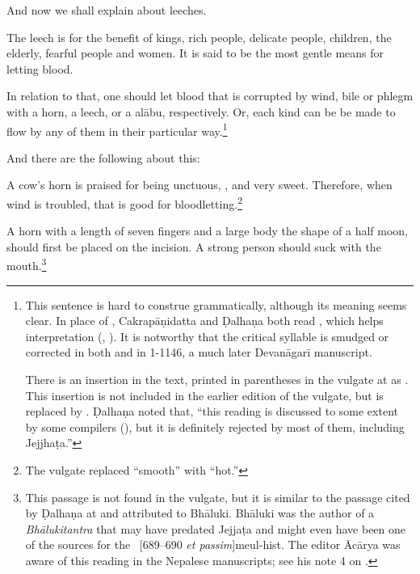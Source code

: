 \begin{translation}    
\item [1] 
    And now we shall explain  about leeches.
    
\item [2 {[3]}]The leech is for the benefit of kings, rich people, 
delicate people,
children, the elderly, fearful people and women.  It is said to be the most
gentle means for letting blood. 

\item [4]

In relation to that, one should let blood that is corrupted by wind, bile or
phlegm with a horn, a leech, or a \gls{alābu}, respectively.   Or, each kind
can be be made to flow by any of them in their particular way.\footnote{This
    sentence is hard to construe grammatically, although its meaning seems
    clear. In place of , Cakrapāṇidatta and Ḍalhaṇa both read
    , which helps interpretation (\cite[95]{acar-1939},
    \cite[55]{vulgate}). It is notworthy that the critical syllable  is
    smudged or corrected in both  and in 1-1146, a
    much later Devanāgarī manuscript.
      
There is an insertion in the text, printed in parentheses in the
vulgate at  as  .  This insertion is not included in the
earlier edition of the vulgate, but is replaced by
 \citep[54]{susr-trikamji2}. Ḍalhaṇa noted that,
“this reading is discussed to some extent by some compilers
(), but it is definitely rejected by most of them,
including Jejjhaṭa.” }



\item [5]
And there are the following about this:

\begin{sloka}
    A cow's horn is praised for being unctuous, , and very
sweet.  Therefore, when wind is troubled, that is good for
bloodletting.\footnote{The vulgate replaced “smooth” with “hot.”}
\end{sloka}

\item [5a]

\begin{sloka}
    A horn with a length of seven fingers and a large body the shape of a half
moon, should first be placed on the incision.  A strong person should suck with
the mouth.\footnote{This passage is not found in the vulgate, but it is
    similar to the passage cited by Ḍalhaṇa at  and attributed to
    Bhāluki.  Bhāluki was the author of a \emph{Bhālukitantra} that may have
    predated Jejjaṭa and might even have been one of the sources for the \SS\
    [689--690 \emph{et passim}]{meul-hist}. The editor Ācārya was
    aware of this reading in the Nepalese manuscripts; see his note 4 on
    \Su{1.13.5}{55, note 4}.}
\end{sloka}


\end{translation}
